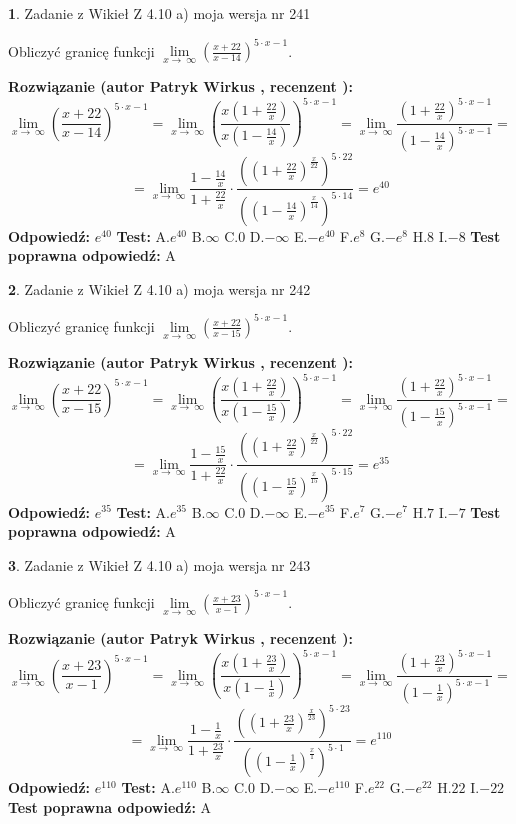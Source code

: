 \documentclass[12pt, a4paper]{article}
\theoremstyle{definition} %
\newtheorem{zad}{}
\newcommand{\zadStart}[1]{\begin{zad}#1\newline}
\newcommand{\zadStop}{\end{zad}}
\newcommand{\rozwStart}[2]{\noindent \textbf{Rozwiązanie (autor #1 , recenzent #2): }\newline}
\newcommand{\rozwStop}{\newline}
\newcommand{\odpStart}{\noindent \textbf{Odpowiedź:}\newline}
\newcommand{\odpStop}{\newline}
\newcommand{\testStart}{\noindent \textbf{Test:}\newline}
\newcommand{\testStop}{\newline}
\newcommand{\kluczStart}{\noindent \textbf{Test poprawna odpowiedź:}\newline}
\newcommand{\kluczStop}{\newline}
\begin{document}
\zadStart{Zadanie z Wikieł Z 4.10 a) moja wersja nr 241}

Obliczyć granicę funkcji  $\lim\limits_{x\to\ \infty}(\frac{x+22}{x-14})^{5\cdot x-1}$.
\zadStop
\rozwStart{Patryk Wirkus}{}
$$\lim\limits_{x\to\ \infty}(\frac{x+22}{x-14})^{5\cdot x-1} = \lim\limits_{x\to\ \infty}(\frac{x(1+\frac{22}{x})}{x(1-\frac{14}{x})})^{5\cdot x-1}=\lim\limits_{x\to\ \infty}\frac{(1+\frac{22}{x})^{5\cdot x-1}}{(1-\frac{14}{x})^{5\cdot x-1}}=$$
$$=\lim\limits_{x\to\ \infty}\frac{1-\frac{14}{x}}{1+\frac{22}{x}}\cdot\frac{((1+\frac{22}{x})^{\frac{x}{22}})^{5\cdot22}}{((1-\frac{14}{x})^{\frac{x}{14}})^{5\cdot14}}=e^{40}$$
\rozwStop
\odpStart
$e^{40}$
\odpStop
\testStart
A.$e^{40}$ B.$\infty$ C.$0$ D.$-\infty$ E.$-e^{40}$
F.$e^{8}$ G.$-e^{8}$
H.$8$
I.$-8$
\testStop
\kluczStart
A
\kluczStop



\zadStart{Zadanie z Wikieł Z 4.10 a) moja wersja nr 242}

Obliczyć granicę funkcji  $\lim\limits_{x\to\ \infty}(\frac{x+22}{x-15})^{5\cdot x-1}$.
\zadStop
\rozwStart{Patryk Wirkus}{}
$$\lim\limits_{x\to\ \infty}(\frac{x+22}{x-15})^{5\cdot x-1} = \lim\limits_{x\to\ \infty}(\frac{x(1+\frac{22}{x})}{x(1-\frac{15}{x})})^{5\cdot x-1}=\lim\limits_{x\to\ \infty}\frac{(1+\frac{22}{x})^{5\cdot x-1}}{(1-\frac{15}{x})^{5\cdot x-1}}=$$
$$=\lim\limits_{x\to\ \infty}\frac{1-\frac{15}{x}}{1+\frac{22}{x}}\cdot\frac{((1+\frac{22}{x})^{\frac{x}{22}})^{5\cdot22}}{((1-\frac{15}{x})^{\frac{x}{15}})^{5\cdot15}}=e^{35}$$
\rozwStop
\odpStart
$e^{35}$
\odpStop
\testStart
A.$e^{35}$ B.$\infty$ C.$0$ D.$-\infty$ E.$-e^{35}$
F.$e^{7}$ G.$-e^{7}$
H.$7$
I.$-7$
\testStop
\kluczStart
A
\kluczStop



\zadStart{Zadanie z Wikieł Z 4.10 a) moja wersja nr 243}

Obliczyć granicę funkcji  $\lim\limits_{x\to\ \infty}(\frac{x+23}{x-1})^{5\cdot x-1}$.
\zadStop
\rozwStart{Patryk Wirkus}{}
$$\lim\limits_{x\to\ \infty}(\frac{x+23}{x-1})^{5\cdot x-1} = \lim\limits_{x\to\ \infty}(\frac{x(1+\frac{23}{x})}{x(1-\frac{1}{x})})^{5\cdot x-1}=\lim\limits_{x\to\ \infty}\frac{(1+\frac{23}{x})^{5\cdot x-1}}{(1-\frac{1}{x})^{5\cdot x-1}}=$$
$$=\lim\limits_{x\to\ \infty}\frac{1-\frac{1}{x}}{1+\frac{23}{x}}\cdot\frac{((1+\frac{23}{x})^{\frac{x}{23}})^{5\cdot23}}{((1-\frac{1}{x})^{\frac{x}{1}})^{5\cdot1}}=e^{110}$$
\rozwStop
\odpStart
$e^{110}$
\odpStop
\testStart
A.$e^{110}$ B.$\infty$ C.$0$ D.$-\infty$ E.$-e^{110}$
F.$e^{22}$ G.$-e^{22}$
H.$22$
I.$-22$
\testStop
\kluczStart
A
\kluczStop
\end{document}
